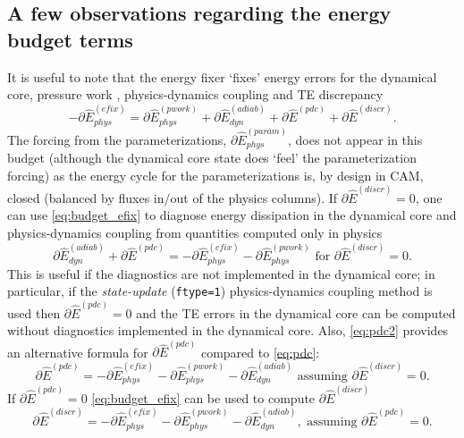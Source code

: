 \documentclass[draft,linenumbers]{agujournal}
\newcommand*{\gi}[1]{\widehat{#1}}
\begin{document}
\subsection{A few observations regarding the energy budget terms}
It is useful to note that the energy fixer `fixes' energy errors for the dynamical core, pressure work {\color{red}{error}}, physics-dynamics coupling and TE discrepancy
\begin{equation}
\label{eq:budget_efix}
-\partial \gi{E}_{phys}^{({efix})}=\partial \gi{E}_{phys}^{({pwork})}+\partial \gi{E}_{dyn}^{({adiab})}+\partial \gi{E}^{({pdc})}+\partial \gi{E}^{({discr})}.
\end{equation}
The forcing from the parameterizations, $\partial \gi{E}_{phys}^{({param})}$, does not appear in this budget (although the dynamical core state does `feel' the parameterization forcing) as the energy cycle for the parameterizations is, by design in CAM, closed (balanced by fluxes in/out of the physics columns). If $\partial \gi{E}^{({discr})}=0$, one can use \eqref{eq:budget_efix} to diagnose energy dissipation in the dynamical core and physics-dynamics coupling from quantities computed only in physics
\begin{equation}
\label{eq:pdc2}
\partial \gi{E}_{dyn}^{({adiab})}+\partial \gi{E}^{({pdc})}=-\partial \gi{E}_{phys}^{({efix})}-\partial \gi{E}_{phys}^{({pwork})} \text{ for  }\partial \gi{E}^{({discr})}=0.
\end{equation}
This is useful if the diagnostics are not implemented in the dynamical core; in particular, if the {\em{state-update}} ({\tt{ftype=1}}) physics-dynamics coupling method is used then $\partial \gi{E}^{({pdc})}=0$ and the TE errors in the dynamical core can be computed without diagnostics implemented in the dynamical core. Also, \eqref{eq:pdc2} provides an alternative formula for $\partial \gi{E}^{({pdc})}$ compared to \eqref{eq:pdc}:
\begin{equation}
\label{eq:pdc3}
\partial \gi{E}^{({pdc})}=-\partial \gi{E}_{phys}^{({efix})}-\partial \gi{E}_{phys}^{({pwork})}-\partial \gi{E}_{dyn}^{({adiab})} \text{ assuming }\partial \gi{E}^{({discr})}=0.
\end{equation}
If $\partial \gi{E}^{({pdc})}=0$ \eqref{eq:budget_efix} can be used to compute $\partial \gi{E}^{({discr})}$
\begin{equation}
\label{eq:discre}
\partial \gi{E}^{({discr})}=-\partial \gi{E}_{phys}^{({efix})}-\partial \gi{E}_{phys}^{({pwork})}-\partial \gi{E}_{dyn}^{({adiab})}, \text{ assuming }\partial \gi{E}^{(pdc)}=0.
\end{equation}
\end{document}
